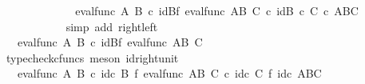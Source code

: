 \begin{isabellebody}
\ \ \ \ \ \ \ \ \isamarkupfalse%
\ \isamarkupfalse%
\ {\isachardoublequoteopen}{\isachardot}{\kern0pt}{\isachardot}{\kern0pt}{\isachardot}{\kern0pt}\ {\isacharequal}{\kern0pt}\ {\isacharparenleft}{\kern0pt}{\isacharparenleft}{\kern0pt}eval{\isacharunderscore}{\kern0pt}func\ A\ B{\isacharparenright}{\kern0pt}\ {\isasymcirc}\isactrlsub c\ {\isacharparenleft}{\kern0pt}id{\isacharparenleft}{\kern0pt}B{\isacharparenright}{\kern0pt}{\isasymtimes}\isactrlsub f\ eval{\isacharunderscore}{\kern0pt}func\ {\isacharparenleft}{\kern0pt}A\isactrlbsup B\isactrlesup {\isacharparenright}{\kern0pt}\ C{\isacharparenright}{\kern0pt}{\isacharparenright}{\kern0pt}\ {\isasymcirc}\isactrlsub c\ id{\isacharparenleft}{\kern0pt}B\ {\isasymtimes}\isactrlsub c\ {\isacharparenleft}{\kern0pt}C\ {\isasymtimes}\isactrlsub c\ {\isacharparenleft}{\kern0pt}{\isacharparenleft}{\kern0pt}A\isactrlbsup B\isactrlesup {\isacharparenright}{\kern0pt}\isactrlbsup C\isactrlesup {\isacharparenright}{\kern0pt}{\isacharparenright}{\kern0pt}{\isacharparenright}{\kern0pt}{\isachardoublequoteclose}\isanewline
\ \ \ \ \ \ \ \ \ \ \isamarkupfalse%
\ {\isacharparenleft}{\kern0pt}simp\ add{\isacharcolon}{\kern0pt}\ right{\isacharunderscore}{\kern0pt}left{\isacharparenright}{\kern0pt}\isanewline
\ \ \ \ \ \ \ \ \isamarkupfalse%
\ \isamarkupfalse%
\ {\isachardoublequoteopen}{\isachardot}{\kern0pt}{\isachardot}{\kern0pt}{\isachardot}{\kern0pt}\ {\isacharequal}{\kern0pt}\ {\isacharparenleft}{\kern0pt}eval{\isacharunderscore}{\kern0pt}func\ A\ B{\isacharparenright}{\kern0pt}\ {\isasymcirc}\isactrlsub c\ {\isacharparenleft}{\kern0pt}id{\isacharparenleft}{\kern0pt}B{\isacharparenright}{\kern0pt}{\isasymtimes}\isactrlsub f\ eval{\isacharunderscore}{\kern0pt}func\ {\isacharparenleft}{\kern0pt}A\isactrlbsup B\isactrlesup {\isacharparenright}{\kern0pt}\ C{\isacharparenright}{\kern0pt}{\isachardoublequoteclose}\isanewline
\ \ \ \ \ \ \ \ \ \ \isamarkupfalse%
\ {\isacharparenleft}{\kern0pt}typecheck{\isacharunderscore}{\kern0pt}cfuncs{\isacharcomma}{\kern0pt}\ meson\ id{\isacharunderscore}{\kern0pt}right{\isacharunderscore}{\kern0pt}unit{}{\isacharparenright}{\kern0pt}\isanewline
\ \ \ \ \ \ \ \ \isamarkupfalse%
\ \isamarkupfalse%
\ {\isachardoublequoteopen}{\isachardot}{\kern0pt}{\isachardot}{\kern0pt}{\isachardot}{\kern0pt}\ {\isacharequal}{\kern0pt}\ eval{\isacharunderscore}{\kern0pt}func\ A\ B\ {\isasymcirc}\isactrlsub c\ id\isactrlsub c\ B\ {\isasymtimes}\isactrlsub f\ eval{\isacharunderscore}{\kern0pt}func\ {\isacharparenleft}{\kern0pt}A\isactrlbsup B\isactrlesup {\isacharparenright}{\kern0pt}\ C\ {\isasymcirc}\isactrlsub c\ id\isactrlsub c\ C\ {\isasymtimes}\isactrlsub f\ id\isactrlsub c\ {\isacharparenleft}{\kern0pt}A\isactrlbsup B\isactrlesup \isactrlbsup C\isactrlesup {\isacharparenright}{\kern0pt}{\isachardoublequoteclose}\isanewline

\end{isabellebody}
